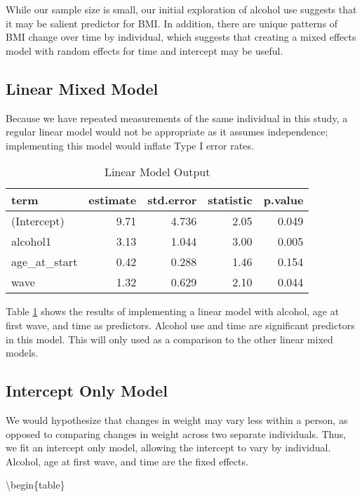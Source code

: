 \documentclass[12pt, twoside]{amherstthesis}
\begin{document}
While our sample size is small, our initial exploration of alcohol use suggests that it may be salient predictor for BMI. In addition, there are unique patterns of BMI change over time by individual, which suggests that creating a mixed effects model with random effects for time and intercept may be useful.

\hypertarget{linear-mixed-model}{%
\subsection{Linear Mixed Model}\label{linear-mixed-model}}

Because we have repeated measurements of the same individual in this study, a regular linear model would not be appropriate as it assumes independence; implementing this model would inflate Type I error rates.
\begin{table}

\caption{\label{tab:lm}Linear Model Output}
\centering
\begin{tabular}[t]{l|r|r|r|r}
\hline
term & estimate & std.error & statistic & p.value\\
\hline
(Intercept) & 9.71 & 4.736 & 2.05 & 0.049\\
\hline
alcohol1 & 3.13 & 1.044 & 3.00 & 0.005\\
\hline
age\_at\_start & 0.42 & 0.288 & 1.46 & 0.154\\
\hline
wave & 1.32 & 0.629 & 2.10 & 0.044\\
\hline
\end{tabular}
\end{table}
Table \ref{tab:lm} shows the results of implementing a linear model with alcohol, age at first wave, and time as predictors. Alcohol use and time are significant predictors in this model. This will only used as a comparison to the other linear mixed models.

\hypertarget{intercept-only-model}{%
\subsection{Intercept Only Model}\label{intercept-only-model}}

We would hypothesize that changes in weight may vary less within a person, as opposed to comparing changes in weight across two separate individuals. Thus, we fit an intercept only model, allowing the intercept to vary by individual. Alcohol, age at first wave, and time are the fixed effects.

\textbackslash begin\{table\}
\end{document}
